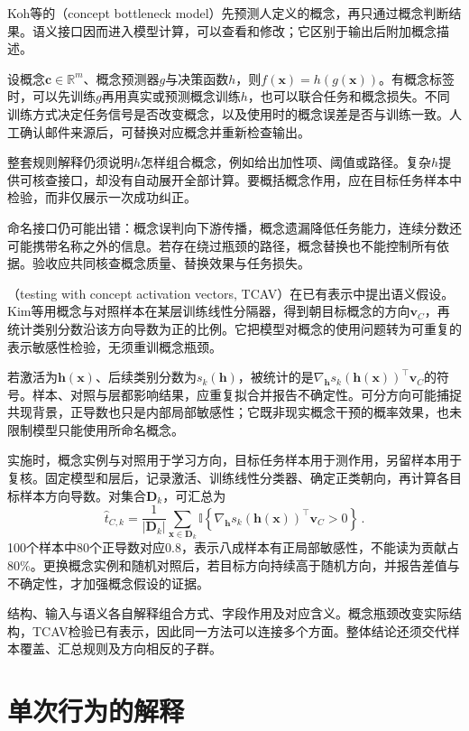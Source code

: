 Koh等的（concept bottleneck model）先预测人定义的概念，再只通过概念判断结果。语义接口因而进入模型计算，可以查看和修改；它区别于输出后附加概念描述。

设概念$\bm c\in\mathbb R^m$、概念预测器$g$与决策函数$h$，则$f(\bm x)=h(g(\bm x))$。有概念标签时，可以先训练$g$再用真实或预测概念训练$h$，也可以联合任务和概念损失。不同训练方式决定任务信号是否改变概念，以及使用时的概念误差是否与训练一致。人工确认邮件来源后，可替换对应概念并重新检查输出。

整套规则解释仍须说明$h$怎样组合概念，例如给出加性项、阈值或路径。复杂$h$提供可核查接口，却没有自动展开全部计算。要概括概念作用，应在目标任务样本中检验，而非仅展示一次成功纠正。

命名接口仍可能出错：概念误判向下游传播，概念遗漏降低任务能力，连续分数还可能携带名称之外的信息。若存在绕过瓶颈的路径，概念替换也不能控制所有依据。验收应共同核查概念质量、替换效果与任务损失。

（testing with concept activation vectors, TCAV）在已有表示中提出语义假设。Kim等用概念与对照样本在某层训练线性分隔器，得到朝目标概念的方向$\bm v_C$，再统计类别分数沿该方向导数为正的比例。它把模型对概念的使用问题转为可重复的表示敏感性检验，无须重训概念瓶颈。

若激活为$\bm h(\bm x)$、后续类别分数为$s_k(\bm h)$，被统计的是$\nabla_{\bm h}s_k(\bm h(\bm x))^\top\bm v_C$的符号。样本、对照与层都影响结果，应重复拟合并报告不确定性。可分方向可能捕捉共现背景，正导数也只是内部局部敏感性；它既非现实概念干预的概率效果，也未限制模型只能使用所命名概念。

实施时，概念实例与对照用于学习方向，目标任务样本用于测作用，另留样本用于复核。固定模型和层后，记录激活、训练线性分类器、确定正类朝向，再计算各目标样本方向导数。对集合$\bm D_k$，可汇总为
\[
 \widehat t_{C,k}
 =\frac1{|\bm D_k|}\sum_{\bm{x}\in\bm D_k}
 \mathbb I\!\left\{
 \nabla_{\bm h}s_k(\bm h(\bm{x}))^\top\bm v_C>0
 \right\}\, .
\]
100个样本中80个正导数对应0.8，表示八成样本有正局部敏感性，不能读为贡献占80\%。更换概念实例和随机对照后，若目标方向持续高于随机方向，并报告差值与不确定性，才加强概念假设的证据。

结构、输入与语义各自解释组合方式、字段作用及对应含义。概念瓶颈改变实际结构，TCAV检验已有表示，因此同一方法可以连接多个方面。整体结论还须交代样本覆盖、汇总规则及方向相反的子群。

\section{单次行为的解释}
\label{sec:interpretability-local}

